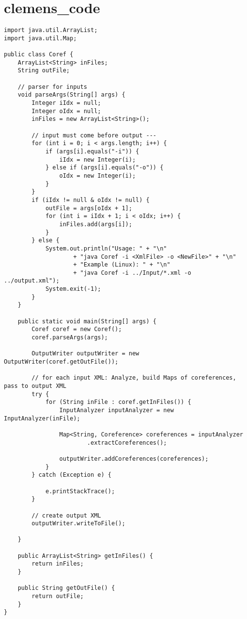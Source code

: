 \section{clemens\_code}\label{clemens_code}
\lstset{language=Java} 
\begin{lstlisting}[caption=Main-Klasse der BuildIndex,label=code:Coref, name=Coref.java] 
import java.util.ArrayList;
import java.util.Map;

public class Coref {
	ArrayList<String> inFiles;
	String outFile;

	// parser for inputs
	void parseArgs(String[] args) {
		Integer iIdx = null;
		Integer oIdx = null;
		inFiles = new ArrayList<String>();

		// input must come before output ---
		for (int i = 0; i < args.length; i++) {
			if (args[i].equals("-i")) {
				iIdx = new Integer(i);
			} else if (args[i].equals("-o")) {
				oIdx = new Integer(i);
			}
		}
		if (iIdx != null & oIdx != null) {
			outFile = args[oIdx + 1];
			for (int i = iIdx + 1; i < oIdx; i++) {
				inFiles.add(args[i]);
			}
		} else {
			System.out.println("Usage: " + "\n"
					+ "java Coref -i <XmlFile> -o <NewFile>" + "\n"
					+ "Example (Linux): " + "\n"
					+ "java Coref -i ../Input/*.xml -o ../output.xml");
			System.exit(-1);
		}
	}

	public static void main(String[] args) {
		Coref coref = new Coref();
		coref.parseArgs(args);

		OutputWriter outputWriter = new OutputWriter(coref.getOutFile());

		// for each input XML: Analyze, build Maps of coreferences, pass to output XML
		try {
			for (String inFile : coref.getInFiles()) {
				InputAnalyzer inputAnalyzer = new InputAnalyzer(inFile);

				Map<String, Coreference> coreferences = inputAnalyzer
						.extractCoreferences();

				outputWriter.addCoreferences(coreferences);
			}
		} catch (Exception e) {

			e.printStackTrace();
		}

		// create output XML
		outputWriter.writeToFile();

	}

	public ArrayList<String> getInFiles() {
		return inFiles;
	}

	public String getOutFile() {
		return outFile;
	}
}
\end{lstlisting} 


